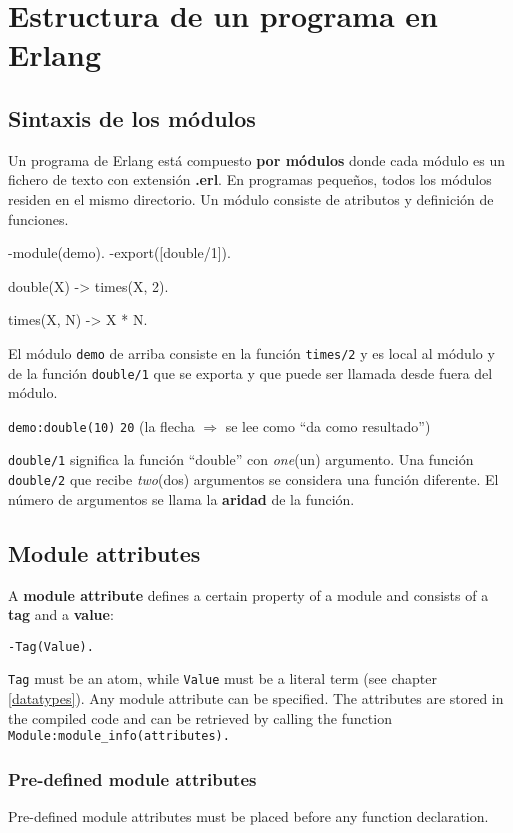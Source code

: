 \chapter{Estructura de un programa en Erlang}

\section{Sintaxis de los m\'odulos}

Un programa de Erlang est\'a compuesto \textbf{por m\'odulos} donde cada m\'odulo
es un fichero de texto con extensi\'on \textbf{.erl}. En programas peque\~nos, todos
los m\'odulos residen en el mismo directorio. Un m\'odulo consiste de atributos y 
definici\'on de funciones.

\begin{erlang}
-module(demo).
-export([double/1]).

double(X) -> times(X, 2).

times(X, N) -> X * N.
\end{erlang}

El m\'odulo \texttt{demo} de arriba consiste en la funci\'on \texttt{times/2}
y es local al m\'odulo y de la funci\'on \texttt{double/1} que se exporta
y que puede ser llamada desde fuera del m\'odulo.

\texttt{demo:double(10)} \resultingin \texttt{20}\hfill
(la flecha $\Rightarrow$ se lee como ``da como resultado'')

\texttt{double/1} significa la funci\'on ``double'' con \textit{one}(un)
argumento. Una funci\'on \texttt{double/2} que recibe \textit{two}(dos) argumentos
se considera una funci\'on diferente. El n\'umero de argumentos se llama la 
\textbf{aridad} de la funci\'on.

\section{Module attributes}
A \textbf{module attribute} defines a certain property of a module and
consists of a \textbf{tag} and a \textbf{value}:

\texttt{-Tag(Value).}

\texttt{Tag} must be an atom, while \texttt{Value} must be a literal
term (see chapter \ref{datatypes}). Any module attribute can be specified. The
attributes are stored in the compiled code and can be retrieved by
calling the function \texttt{Module:module\_info(attributes).}

\subsection{Pre-defined module attributes}
Pre-defined module attributes must be placed before any function
declaration.

